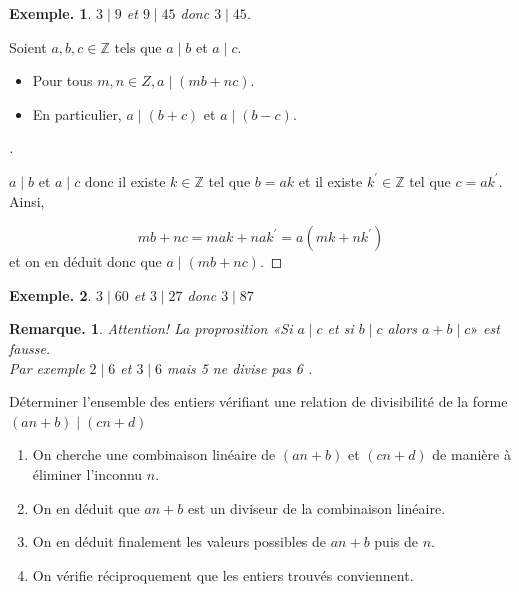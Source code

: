 \documentclass[12pt]{article}
\newcommand{\hideM}[1]{#1}
\theoremstyle{break}
\newtheorem*{example}{Exemple.}
\newtheorem*{remark}{Remarque.}
\newenvironment{demo}[1][\proofname]{%
  \begin{proof}[#1]$ $\newline
}{%
  \end{proof}
}
\begin{document}
\begin{example}
    $3 \mid 9$ et $9 \mid 45$ donc $3 \mid 45$.
\end{example}

\begin{proposition}{}{}
    Soient $a, b, c \in \mathbb{Z}$ tels que $a \mid b$ et $a \mid c$.
    
    \begin{itemize}[noitemsep,topsep=0pt]
      \item Pour tous $m, n \in Z, \hideM{a \mid(m b+n c)}$.
      \item En particulier, $\hideM{a \mid(b+c)$ et $a \mid(b-c)}$.
    \end{itemize}
\end{proposition}

\begin{demo}
    $a \mid b$ et $a \mid c$ donc il existe $k \in \mathbb{Z}$ tel que $b=a k$ et il existe $k^{\prime} \in \mathbb{Z}$ tel que $c=a k^{\prime}$. Ainsi,
    
    $$
    m b+n c=m a k+n a k^{\prime}=a\left(m k+n k^{\prime}\right)
    $$
    \noindent 
    et on en déduit donc que $a \mid(m b+n c)$.
\end{demo}

\begin{example}
    $3 \mid 60$ et $3 \mid 27$ donc $3 \mid 87$
\end{example}

\begin{remark}
Attention! La proprosition «Si $a \mid c$ et si $b \mid c$ alors $a+b \mid c »$ est fausse.\\
Par exemple $2 \mid 6$ et $3 \mid 6$ mais 5 ne divise pas 6 .
\end{remark}

\begin{method}{Déterminer l'ensemble des entiers vérifiant une relation de divisibilité de la forme $(a n+b) \mid(c n+d)$}{}
    \begin{enumerate}[noitemsep,topsep=0pt]
      \item On cherche une combinaison linéaire de $(a n+b)$ et $(c n+d)$ de manière à éliminer l'inconnu $n$.
      \item On en déduit que $a n+b$ est un diviseur de la combinaison linéaire.
      \item On en déduit finalement les valeurs possibles de $a n+b$ puis de $n$.
      \item On vérifie réciproquement que les entiers trouvés conviennent.
    \end{enumerate}
\end{method}
\end{document}
